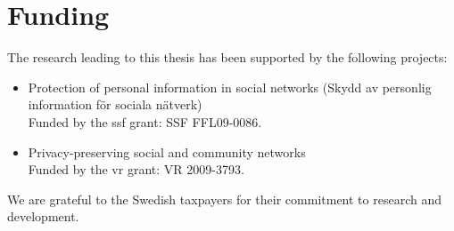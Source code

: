 \section*{Funding}
The research leading to this thesis has been supported by the following projects:
\begin{itemize}
    \item Protection of personal information in social networks (Skydd av personlig 
    information f{\"o}r sociala n{\"a}tverk)\\
    Funded by the \ac*{ssf} grant: SSF FFL09-0086.
    \item Privacy-preserving social and community networks\\
    Funded by the \ac*{vr} grant: VR 2009-3793.
\end{itemize}

We are grateful to the Swedish taxpayers for their commitment to research and development.
